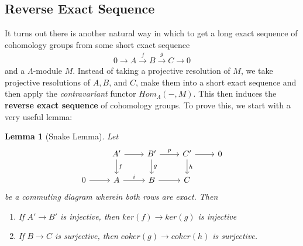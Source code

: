 \documentclass[12pt]{book}
\newtheorem{lemma}[theorem]{Lemma}
\theoremstyle{definition}
\begin{document}
\subsection{Reverse Exact Sequence}
It turns out there is another natural way in which to get a long exact sequence of cohomology groups from some short exact sequence
\begin{align*}
    0 \rightarrow A \xrightarrow{f} B \xrightarrow{g} C \rightarrow 0 
\end{align*}
and a $\Lambda$-module $M$. Instead of taking a projective resolution of $M$, we take projective resolutions of $A,B$, and $C$, make them into a short exact sequence and then apply the \textit{contravariant} functor $Hom_\Lambda(-,M)$. This then induces the \textbf{reverse exact sequence} of cohomology groups. To prove this, we start with a very useful lemma: 

\begin{lemma}[Snake Lemma]
    Let
    \[
    \begin{tikzcd}
        & A' \arrow[r] \arrow[d, "f"] & B' \arrow[r, "p"] \arrow[d, "g"] & C' \arrow[r] \arrow[d, "h"] & 0\\
        0 \arrow[r] & A \arrow[r, "i"] & B \arrow[r] & C &
    \end{tikzcd}
    \]    
    be a commuting diagram wherein both rows are exact. Then
    \begin{enumerate}
        \item If $A' \to B'$ is injective, then $ker(f) \to ker(g)$ is injective
        \item If $B \to C$ is surjective, then $coker(g) \to coker(h)$ is surjective. 
    \end{enumerate}
\end{lemma}
\end{document}

